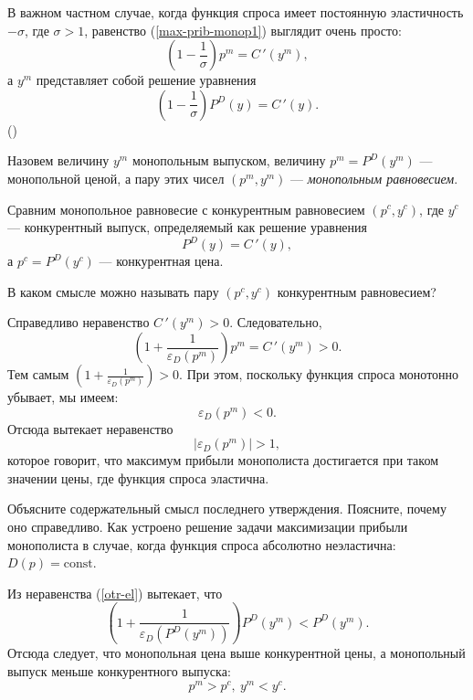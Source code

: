     В важном частном случае, когда функция спроса имеет постоянную
    эластичность $-\sigma$, где $\sigma>1$, равенство
    (\ref{max-prib-monop1}) выглядит очень просто:
    \[\left(1-\frac{1}{\sigma}\right)p^{m}=C\,'(y^{m}),\]
    а $y^{m}$ представляет собой решение уравнения
    \[\left(1-\frac{1}{\sigma}\right)P^{D}(y)=C\,'(y).\]
 ()



    Назовем величину $y^{m}$ монопольным выпуском, величину
    $p^{m}=P^{D}(y^{m})$ --- монопольной ценой, а пару этих чисел
    $(p^{m},y^{m})$ --- \emph{монопольным равновесием}.

    Сравним монопольное равновесие с конкурентным равновесием
    $(p^{c},y^{c})$, где $y^{c}$ --- конкурентный выпуск,
    определяемый как решение уравнения
    \[P^{D}(y)=C\,'(y),\]
    а $p^{c}=P^{D}(y^{c})$ --- конкурентная цена.




\begin{exer}
    В каком смысле можно называть пару $(p^{c},y^{c})$ конкурентным равновесием?
\end{exer}

    Справедливо неравенство $C\,'(y^{m})>0$. Следовательно,
    \[\left(1+\frac{1}{\varepsilon_{D}(p^{m})}\right)p^{m}=C\,'(y^{m})>0.\]
    Тем самым
    $\left(1+\frac{1}{\varepsilon_{D}(p^{m})}\right)>0.$
    При этом,
    поскольку функция спроса монотонно убывает, мы имеем:
\begin{equation}
    \label{otr-el}
    \varepsilon_{D}(p^{m})<0 .
\end{equation}
    Отсюда вытекает неравенство
    \[|\varepsilon_{D}(p^{m})|>1,\]
    которое говорит, что максимум прибыли монополиста достигается при таком
    значении цены, где функция спроса эластична.

\begin{exer}
    Объясните содержательный смысл последнего утверждения. Поясните,
    почему оно справедливо. Как устроено решение задачи максимизации
    прибыли монополиста в случае, когда функция спроса абсолютно
    неэластична: $D(p)=\text{const}$.
\end{exer}

    Из неравенства (\ref{otr-el}) вытекает, что
\begin{equation}
    \label{ner-mon-con}
    \left(1+\frac{1}{\varepsilon_{D}(P^{D}(y^{m}))}\right)P^{D}(y^{m})<P^{D}(y^{m}).
\end{equation}
    Отсюда следует,  что монопольная цена выше конкурентной цены,
    а монопольный выпуск меньше конкурентного выпуска:
        \[ p^{m}>p^{c}, \ y^{m}<y^{c}.\]


